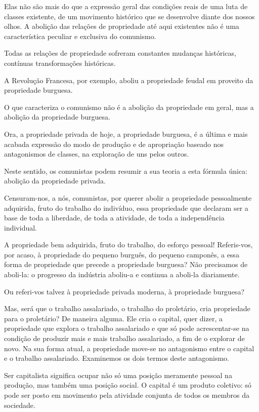 Elas não são mais do que a expressão geral das condições reais de uma
luta de classes existente, de um movimento histórico que se desenvolve
diante dos nossos olhos. A abolição das relações de propriedade até
aqui existentes não é uma característica peculiar e exclusiva do
comunismo.

Todas as relações de propriedade sofreram constantes mudanças
históricas, contínuas transformações históricas.

A Revolução Francesa, por exemplo, aboliu a propriedade feudal em
proveito da propriedade burguesa.

O que caracteriza o comunismo não é a abolição da propriedade em
geral, mas a abolição da propriedade burguesa.

Ora, a propriedade privada de hoje, a propriedade burguesa, é a última
e mais acabada expressão do modo de produção e de apropriação baseado
nos antagonismos de classes, na exploração de uns pelos outros.

Neste sentido, os comunistas podem resumir a sua teoria a esta fórmula
única: abolição da propriedade privada.

Censuram-nos, a nós, comunistas, por querer abolir a propriedade
pessoalmente adquirida, fruto do trabalho do indivíduo, essa
propriedade que declaram ser a base de toda a liberdade, de toda a
atividade, de toda a independência individual.

A propriedade bem adquirida, fruto do trabalho, do esforço pessoal!
Referis-vos, por acaso, à propriedade do pequeno burguês, do pequeno
camponês, a essa forma de propriedade que precede a propriedade
burguesa? Não precisamos de aboli-la: o progresso da indústria
aboliu-a e continua a aboli-la diariamente.

Ou referi-vos talvez à propriedade privada moderna, à propriedade
burguesa?

Mas, será que o trabalho assalariado, o trabalho do proletário, cria
propriedade para o proletário? De maneira alguma. Ele cria o capital,
quer dizer, a propriedade que explora o trabalho assalariado e que só
pode acrescentar-se na condição de produzir mais e mais trabalho
assalariado, a fim de o explorar de novo. Na sua forma atual, a
propriedade move-se no antagonismo entre o capital e o trabalho
assalariado. Examinemos os dois termos deste antagonismo.

Ser capitalista significa ocupar não só uma posição meramente pessoal
na produção, mas também uma posição social. O capital é um produto
coletivo: só pode ser posto em movimento pela atividade conjunta de
todos os membros da sociedade.

